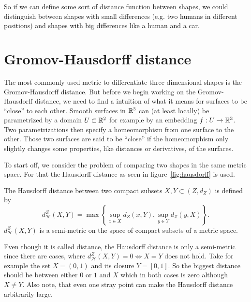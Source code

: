 So if we can define some sort of distance function between shapes, we could distinguish between shapes with small differences (e.g. two humans in different positions) and shapes with big differences like a human and a car.

\section{Gromov-Hausdorff distance}
The most commonly used metric to differentiate three dimensional shapes is the Gromov-Hausdorff distance.
But before we begin working on the Gromov-Hausdorff distance, we need to find a intuition of what it means for surfaces to be ``close'' to each other.
Smooth surfaces in $\mathbb{R}^3$ can (at least locally) be parametrized by a domain $U \subset \mathbb{R}^2$ for example by an embedding $f: U\rightarrow \mathbb{R}^3$.
Two parametrizations then specify a homeomorphism from one surface to the other.
Those two surfaces are said to be ``close'' if the homeomorphism only slightly changes some properties, like distances or derivatives, of the surfaces.

To start off, we consider the problem of comparing two shapes in the same metric space.
For that the Hausdorff distance as seen in figure~\ref{fig:hausdorff} is used.
\begin{mydef}
	The Hausdorff distance between two compact subsets $X,Y \subset (Z,d_Z)$ is defined by
	$$d^Z_\mathcal{H}(X,Y) = \max \left\{ \sup_{x \in X} d_Z(x,Y), \sup_{y \in Y} d_Z(y,X)\right\}.$$
	$d^Z_\mathcal{H}(X,Y)$ is a semi-metric on the space of compact subsets of a metric space.
\end{mydef}
Even though it is called distance, the Hausdorff distance is only a semi-metric since there are cases, where $d^Z_\mathcal{H}(X,Y) = 0 \Leftrightarrow X = Y$ does not hold.
Take for example the set $X = (0,1)$ and its closure $Y = [0,1]$.
So the biggest distance should be between either $0$ or $1$ and $X$ which in both cases is zero although $X \neq Y$.
Also note, that even one stray point can make the Hausdorff distance arbitrarily large.

